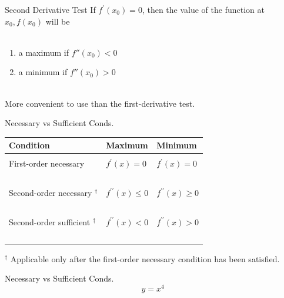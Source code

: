 \documentclass{./../../Latex/teaching_slides}
\begin{document}
\begin{frame}{Second Derivative Test}
If $f^{\prime}\left(x_{0}\right)=0$, then the value of the function at $x_{0}, f\left(x_{0}\right)$ will be \\~\\
\begin{enumerate}
  \item a maximum if $f''(x_0)<0$
  \item a minimum if $f''(x_0)>0$ \\~\\
\end{enumerate}
More convenient to use than the first-derivative test.
\end{frame}

\begin{frame}{Necessary vs Sufficient Conds.}
\begin{tabularx}{\textwidth}{lXX}
\hline Condition & Maximum & Minimum \\
\hline \\ 
First-order necessary & $f^{\prime}(x)=0$ & $f^{\prime}(x)=0$ \\~\\
Second-order necessary ${ }^{\dagger}$ & $f^{\prime \prime}(x) \leq 0$ & $f^{\prime \prime}(x) \geq 0$ \\~\\
Second-order sufficient ${ }^{\dagger}$ & $f^{\prime \prime}(x)<0$ & $f^{\prime \prime}(x)>0$ \\~\\
\hline
\end{tabularx}
\vspace{0.25em}

${ }^{\dagger}$ Applicable only after the first-order necessary condition has been satisfied.
\end{frame}

\begin{frame}{Necessary vs Sufficient Conds.}
\vspace{-1.5em}
$$ y = x^4 $$ \\~\\
\centering
{}
\end{frame}
\end{document}
